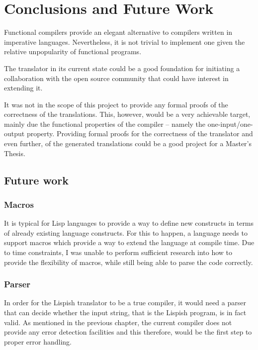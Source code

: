 \chapter{Conclusions and Future Work}

Functional compilers provide an elegant alternative to compilers written in imperative languages. Nevertheless, it is not trivial to implement one given the relative unpopularity of functional programs. 

The translator in its current state could be a good foundation for initiating a collaboration with the open source community that could have interest in extending it. 

It was not in the scope of this project to provide any formal proofs of the correctness of the translations. This, however, would be a very achievable target, mainly due the functional properties of the compiler -- namely the one-input/one-output property. 
Providing formal proofs for the correctness of the translator and even further, of the generated translations could be a good project for a Master's Thesis. 

\section{Future work}
\subsection{Macros}
It is typical for Lisp languages to provide a way to define new constructs in terms of already existing language constructs.
For this to happen, a language needs to support macros which 
provide a way to extend the language at compile time. 
Due to time constraints, I was unable to perform sufficient research into how to provide the flexibility of macros, while still being able to parse the code correctly. 

\subsection{Parser}
In order for the Lispish translator to be a true compiler, it would need a parser that can decide whether the input string, that is the Lispish program, is in fact valid. As mentioned in the previous chapter, the current compiler does not provide any error detection facilities and this therefore, would be the first step to proper error handling. 

%
